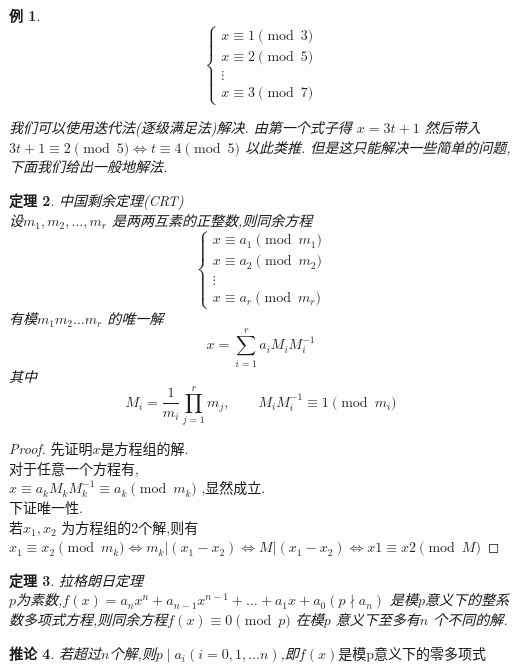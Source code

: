 \documentclass[12pt, a4paper, oneside]{ctexbook}
\newtheorem{theorem}{定理}[section]
\newtheorem{corollary}[theorem]{推论}
\newtheorem{example}[theorem]{例}
\begin{document}
\begin{example}
  $$
\begin{cases}
x \equiv 1 \pmod{3} \\
x \equiv 2 \pmod{5} \\
\vdots \\
x \equiv 3 \pmod{7}
\end{cases}
$$

我们可以使用迭代法(逐级满足法)解决.
由第一个式子得 $x=3t+1$
然后带入$3t+1 \equiv 2 \pmod{5} \iff t \equiv 4\pmod{5}$
以此类推.
但是这只能解决一些简单的问题,下面我们给出一般地解法.
\end{example}


\begin{theorem}
  中国剩余定理(CRT)\\
  设$m_1,m_2,\dots ,m_r$ 是两两互素的正整数,则同余方程
$$
\begin{cases}
x \equiv a_1 \pmod{m_1} \\
x \equiv a_2 \pmod{m_2} \\
\vdots \\
x \equiv a_r \pmod{m_r}
\end{cases}
$$
有模$m_1m_2\dots m_r$ 的唯一解
$$
x=\sum_{i=1}^{r} a_iM_iM_i^{-1} 
$$
其中
$$
M_i= \frac{1}{m_i}\prod_{j=1}^r m_j ,\qquad M_iM_i^{-1} \equiv 1 \pmod{m_i}
$$
\end{theorem}

\begin{proof}
  先证明$x$是方程组的解.\\
对于任意一个方程有,\\
$x \equiv a_kM_kM_k^{-1}  \equiv a_k \pmod{m_k}$ ,显然成立.\\
下证唯一性.\\
若$x_1,x_2$ 为方程组的2个解,则有$x_1 \equiv x_2 \pmod{m_k} \iff m_k|(x_1-x_2) \iff M|(x_1-x_2) \iff x1 \equiv x2 \pmod{M}$
\end{proof}


\begin{theorem}
  拉格朗日定理\\
  $p$为素数,$f(x)=a_nx^n+a_{n-1}x^{n-1}+\dots +a_1x+a_0(p \nmid a_n)$ 
  是模$p$意义下的整系数多项式方程,则同余方程$f(x) \equiv 0 \pmod{p}$ 在模$p$ 意义下至多有$n$ 个不同的解.
\end{theorem}


\begin{corollary}
  若超过$n$个解,则$p \mid a_i(i=0,1,\dots n)$,即$f(x) \text{是模p意义下的零多项式}$
\end{corollary}
\end{document}

